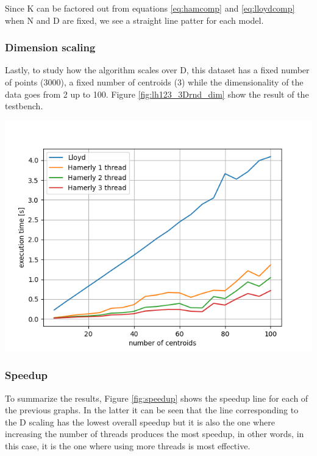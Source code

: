 \documentclass{report}
\begin{document}
\begin{minipage}[b]{0.48\textwidth}
  Since K can be factored out from equations \ref{eq:hamcomp} and \ref{eq:lloydcomp} when N and D are fixed, we see a straight line patter for each model.
  
  \subsubsection*{Dimension scaling}
  Lastly, to study how the algorithm scales over D, this dataset has a fixed number of points (3000), a fixed number of centroids (3) while the dimensionality of the data goes from 2 up to 100. Figure \ref{fig:lh123_3Drnd_dim} show the result of the testbench.

  \begin{center} 
    \includegraphics[width = 1\textwidth]{imgs/lh123_3Drnd_dim.png}
    \label{fig:lh123_3Drnd_dim}
  \end{center}

  \subsubsection*{Speedup}
  To summarize the results, Figure \ref{fig:speedup} shows the speedup line for each of the previous graphs. In the latter it can be seen that the line corresponding to the D scaling has the lowest overall speedup but it is also the one where increasing the number of threads produces the most speedup, in other words, in this case, it is the one where using more threads is most effective.


\end{minipage}
\end{document}
